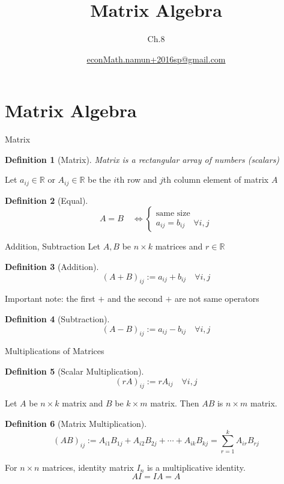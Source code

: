 \documentclass[a4paper,11pt]{article}
\author[조남운]{\url{econMath.namun+2016sp@gmail.com}}
\title{Matrix Algebra}
\subtitle{Ch.8}
\newtheorem{defn}{Definition}
\begin{document}
	
\maketitle


\section{Matrix Algebra} %
\label{sec:matrix_algebra}
\begin{frame}[t]{Matrix}
	\begin{defn}
		[Matrix]
		Matrix is a rectangular array of numbers (scalars)
	\end{defn}
	
	Let $a_{ij}\in \mathbb{R}$ or $A_{ij}\in\mathbb{R}$ be the $i$th row and $j$th column element of matrix $A$
	
	\begin{defn}
		[Equal]
		\[
			A=B\quad \iff \begin{cases}
				\text{same size}\\
				a_{ij}=b_{ij} \quad \forall i,j
			\end{cases}
		\]
	\end{defn}
	
\end{frame}

\begin{frame}[t]{Addition, Subtraction}
	Let $A,B$ be $n\times k$ matrices and $r\in \mathbb{R}$
	\begin{defn}
		[Addition]
		\[
			(A+B)_{ij} := a_{ij}+b_{ij}\quad\forall i,j
		\]
	\end{defn}
	Important note: the first $+$ and the second $+$ are not same operators
	
	\begin{defn}
		[Subtraction]
		\[
			(A-B)_{ij} := a_{ij}-b_{ij}\quad\forall i,j
		\]
	\end{defn}
\end{frame}

\begin{frame}[t]{Multiplications of Matrices}
	\begin{defn}
		[Scalar Multiplication]
		\[
			(rA)_{ij} := r A_{ij}\quad\forall i,j
		\]
	\end{defn}
	Let $A$ be $n\times k$ matrix and $B$ be $k\times m$ matrix. Then $AB$ is $n\times m$ matrix.
	\begin{defn}
		[Matrix Multiplication]
		\[
			(AB)_{ij}:=A_{i1}B_{1j}+A_{i2}B_{2j}+\cdots+A_{ik}B_{kj}= \sum_{r=1}^k A_{ir}B_{rj}
		\]
	\end{defn}
	For $n\times n$ matrices, identity matrix $I_n$ is a multiplicative identity. 
	\[
		AI = IA = A
	\]
\end{frame}
\end{document}
